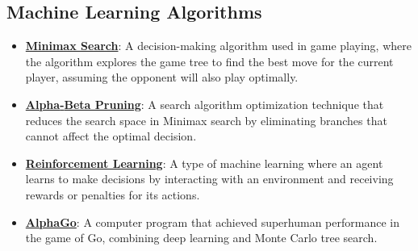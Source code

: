 \documentclass{article}%
\begin{document}
\subsection{Machine Learning Algorithms}%
\label{subsec:MachineLearningAlgorithms}%
\begin{itemize}[leftmargin=*]%
\item \href{https://purdue.brightspace.com/d2l/common/assets/pdfjs-d2l-dist/1.0.14-legacy/web/viewer.html?file=\%2Fcontent\%2Fenforced\%2F1095467-wl.202510.CS.24300.001\%2F02L2-Intro.pdf\%3Fou\%3D1095467\&lang=en-us\&container=d2l-fileviewer-rendered-pdf\&fullscreen=d2l-fileviewer-rendered-pdf-dialog\&height=667#page=22}{\textbf{Minimax Search}}: A decision{-}making algorithm used in game playing, where the algorithm explores the game tree to find the best move for the current player, assuming the opponent will also play optimally.%
\item \href{https://purdue.brightspace.com/d2l/common/assets/pdfjs-d2l-dist/1.0.14-legacy/web/viewer.html?file=\%2Fcontent\%2Fenforced\%2F1095467-wl.202510.CS.24300.001\%2F02L2-Intro.pdf\%3Fou\%3D1095467\&lang=en-us\&container=d2l-fileviewer-rendered-pdf\&fullscreen=d2l-fileviewer-rendered-pdf-dialog\&height=667#page=23}{\textbf{Alpha{-}Beta Pruning}}: A search algorithm optimization technique that reduces the search space in Minimax search by eliminating branches that cannot affect the optimal decision.%
\item \href{https://purdue.brightspace.com/d2l/common/assets/pdfjs-d2l-dist/1.0.14-legacy/web/viewer.html?file=\%2Fcontent\%2Fenforced\%2F1095467-wl.202510.CS.24300.001\%2F02L2-Intro.pdf\%3Fou\%3D1095467\&lang=en-us\&container=d2l-fileviewer-rendered-pdf\&fullscreen=d2l-fileviewer-rendered-pdf-dialog\&height=667#page=46}{\textbf{Reinforcement Learning}}: A type of machine learning where an agent learns to make decisions by interacting with an environment and receiving rewards or penalties for its actions.%
\item \href{https://purdue.brightspace.com/d2l/common/assets/pdfjs-d2l-dist/1.0.14-legacy/web/viewer.html?file=\%2Fcontent\%2Fenforced\%2F1095467-wl.202510.CS.24300.001\%2F02L2-Intro.pdf\%3Fou\%3D1095467\&lang=en-us\&container=d2l-fileviewer-rendered-pdf\&fullscreen=d2l-fileviewer-rendered-pdf-dialog\&height=667#page=10}{\textbf{AlphaGo}}: A computer program that achieved superhuman performance in the game of Go, combining deep learning and Monte Carlo tree search.%
\end{itemize}
\end{document}

